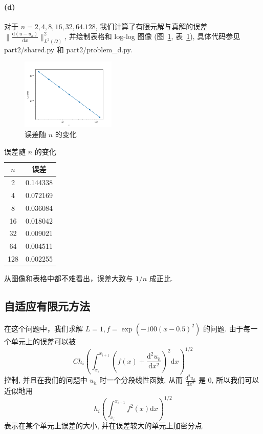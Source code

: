 \documentclass[UTF8]{article}
\begin{document}
    \paragraph{(d)}
    对于 $n = 2,4,8,16,32,64.128$, 我们计算了有限元解与真解的误差 $\lVert \frac{\textrm{d}(u-u_h)}{\textrm{d}x} \rVert^2_{L^2(\Omega)}$, 并绘制表格和 log-log 图像 (图~\ref{fig:figure2}, 表~\ref{tab:table1}), 具体代码参见 part2/shared.py 和 part2/problem\_d.py.

    \begin{figure}
        \centering
        \includegraphics[width=0.4\textwidth]{./assets/fig1}
        \caption{误差随 $n$ 的变化}
        \label{fig:figure2}
    \end{figure}

    \begin{table}
        \centering
        \begin{tabular}{|c|c|}
            \hline
            $n$ & 误差       \\
            \hline
            2   & 0.144338 \\
            4   & 0.072169 \\
            8   & 0.036084 \\
            16  & 0.018042 \\
            32  & 0.009021 \\
            64  & 0.004511 \\
            128 & 0.002255 \\
            \hline
        \end{tabular}
        \caption{误差随 $n$ 的变化}
        \label{tab:table1}
    \end{table}

    从图像和表格中都不难看出，误差大致与 $1/n$ 成正比.

    \subsection{自适应有限元方法}

    在这个问题中，我们求解 $L=1, f=\exp(-100 (x-0.5)^2)$ 的问题.
    由于每一个单元上的误差可以被
    \[
        Ch_i\left( \int_{x_i}^{x_{i+1}} \left( f(x)+ \frac{\textrm{d}^2 u_h}{\textrm{d}x^2}\right)^2 \textrm{d}x \right)^{1/2}
    \]
    控制, 并且在我们的问题中 $u_h$ 时一个分段线性函数, 从而 $\frac{\textrm{d}^2 u_h}{\textrm{d}x^2}$ 是 0, 所以我们可以近似地用
    \[
        h_i\left( \int_{x_i}^{x_{i+1}} f^2(x)\textrm{d}x \right)^{1/2}
    \]
    表示在某个单元上误差的大小, 并在误差较大的单元上加密分点.
\end{document}
